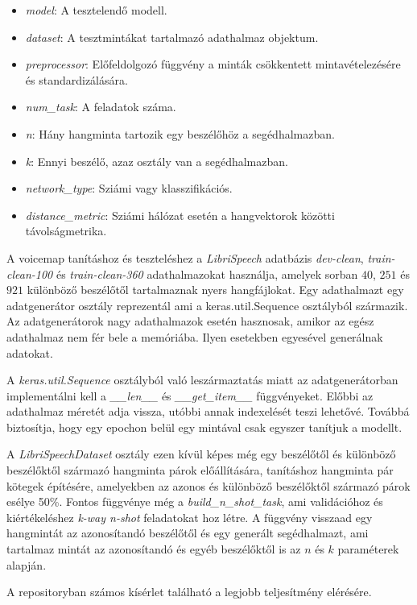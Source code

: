 \begin{itemize}
	\item  \emph{model}: A tesztelendő modell.
	\item  \emph{dataset}: A tesztmintákat tartalmazó adathalmaz objektum.
	\item  \emph{preprocessor}: Előfeldolgozó függvény a minták csökkentett mintavételezésére és standardizálására.
	\item  \emph{num\_task}: A feladatok száma.
	\item  \emph{n}: Hány hangminta tartozik egy beszélőhöz a segédhalmazban.
	\item  \emph{k}: Ennyi beszélő, azaz osztály van a segédhalmazban.
	\item  \emph{network\_type}: Sziámi vagy klasszifikációs.
	\item  \emph{distance\_metric}: Sziámi hálózat esetén a hangvektorok közötti távolságmetrika.
\end{itemize}

A voicemap tanításhoz és teszteléshez a \emph{LibriSpeech} adatbázis \emph{dev-clean}, \emph{train-clean-100} és \emph{train-clean-360} adathalmazokat használja, amelyek sorban $40$, $251$ és $921$ különböző beszélőtől tartalmaznak nyers hangfájlokat. Egy adathalmazt egy adatgenerátor osztály reprezentál ami a keras.util.Sequence osztályból származik. Az adatgenerátorok nagy adathalmazok esetén hasznosak, amikor az egész adathalmaz nem fér bele a memóriába. Ilyen esetekben egyesével generálnak adatokat.

A \emph{keras.util.Sequence} osztályból való leszármaztatás miatt az adatgenerátorban implementálni kell a \emph{\_\_len\_\_} és \emph{\_\_get\_item\_\_} függvényeket. Előbbi az adathalmaz méretét adja vissza, utóbbi annak indexelését teszi lehetővé. Továbbá biztosítja, hogy egy epochon belül egy mintával csak egyszer tanítjuk a modellt.

A \emph{LibriSpeechDataset} osztály ezen kívül képes még egy beszélőtől és különböző beszélőktől származó hangminta párok előállítására, tanításhoz hangminta pár kötegek építésére, amelyekben az azonos és különböző beszélőktől származó párok esélye 50\%. Fontos függvénye még a \emph{build\_n\_shot\_task}, ami validációhoz és kiértékeléshez \emph{k-way n-shot} feladatokat hoz létre. A függvény visszaad egy hangmintát az azonosítandó beszélőtől és egy generált segédhalmazt, ami tartalmaz mintát az azonosítandó és egyéb beszélőktől is az $n$ és $k$ paraméterek alapján.

A repositoryban számos kísérlet található a legjobb teljesítmény elérésére.

